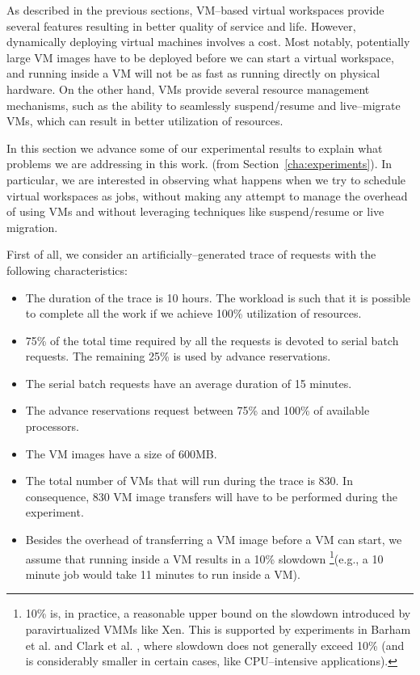 As described in the previous sections, VM--based virtual workspaces provide several features resulting in better quality of service and life. However, dynamically deploying virtual machines involves a cost. Most notably, potentially large VM images have to be deployed before we can start a virtual workspace, and running inside a VM will not be as fast as running directly on physical hardware. On the other hand, VMs provide several resource management mechanisms, such as the ability to seamlessly suspend/resume and live--migrate VMs, which can result in better utilization of resources.

In this section we advance some of our experimental results to explain what problems we are addressing in this work. (from Section~\ref{cha:experiments}). In particular, we are interested in observing what happens when we try to schedule virtual workspaces as jobs, without making any attempt to manage the overhead of using VMs and without leveraging techniques like suspend/resume or live migration.

First of all, we consider an artificially--generated trace of requests with the following characteristics:

\begin{itemize}
\item The duration of the trace is 10 hours. The workload is such that it is possible to complete all the work if we achieve 100\% utilization of resources.
\item 75\% of the total time required by all the requests is devoted to serial batch requests. The remaining 25\% is used by advance reservations.
\item The serial batch requests have an average duration of 15 minutes.
\item The advance reservations request between 75\% and 100\% of available processors.
\item The VM images have a size of 600MB. 
\item The total number of VMs that will run during the trace is 830. In consequence, 830 VM image transfers will have to be performed during the experiment.
\item Besides the overhead of transferring a VM image before a VM can start, we assume that running inside a VM results in a 10\% slowdown \footnote{10\% is, in practice, a reasonable upper bound on the slowdown introduced by paravirtualized VMMs like Xen. This is supported by experiments in Barham et al. \cite{xen} and Clark et al. \cite{xenrepeated}, where slowdown does not generally exceed 10\% (and is considerably smaller in certain cases, like CPU--intensive applications).}(e.g., a 10 minute job would take 11 minutes to run inside a VM). 
\end{itemize}

